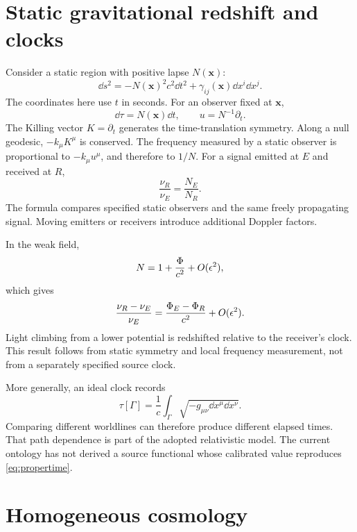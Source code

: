 \documentclass[11pt]{article}
\begin{document}
\section{Static gravitational redshift and clocks}
Consider a static region with positive lapse $N(\mathbf x)$:
\begin{equation}
\dd s^2=-N(\mathbf x)^2c^2\dd t^2+\gamma_{ij}(\mathbf x)\dd x^i\dd x^j.
\label{eq:staticmetric}
\end{equation}
The coordinates here use $t$ in seconds. For an observer fixed at $\mathbf x$,
\begin{equation}
\dd\tau=N(\mathbf x)\dd t,\qquad u=N^{-1}\partial_t.
\label{eq:stationaryclock}
\end{equation}
The Killing vector $K=\partial_t$ generates the time-translation symmetry. Along a null geodesic, $-k_\mu K^\mu$ is conserved. The frequency measured by a static observer is proportional to $-k_\mu u^\mu$, and therefore to $1/N$. For a signal emitted at $E$ and received at $R$,
\begin{equation}
\frac{\nu_R}{\nu_E}=\frac{N_E}{N_R}.
\label{eq:redshift}
\end{equation}
The formula compares specified static observers and the same freely propagating signal. Moving emitters or receivers introduce additional Doppler factors.

In the weak field,
\begin{equation}
N=1+\frac{\Phi}{c^2}+O(\epsilon^2),
\label{eq:lapseweakfield}
\end{equation}
which gives
\begin{equation}
\frac{\nu_R-\nu_E}{\nu_E}=\frac{\Phi_E-\Phi_R}{c^2}+O(\epsilon^2).
\label{eq:weakredshift}
\end{equation}
Light climbing from a lower potential is redshifted relative to the receiver's clock. This result follows from static symmetry and local frequency measurement, not from a separately specified source clock.

More generally, an ideal clock records
\begin{equation}
\tau[\Gamma]=\frac1c\int_\Gamma\sqrt{-g_{\mu\nu}\dd x^\mu\dd x^\nu}.
\label{eq:propertime}
\end{equation}
Comparing different worldlines can therefore produce different elapsed times. That path dependence is part of the adopted relativistic model. The current ontology has not derived a source functional whose calibrated value reproduces \eqref{eq:propertime}.

\section{Homogeneous cosmology}
\end{document}
